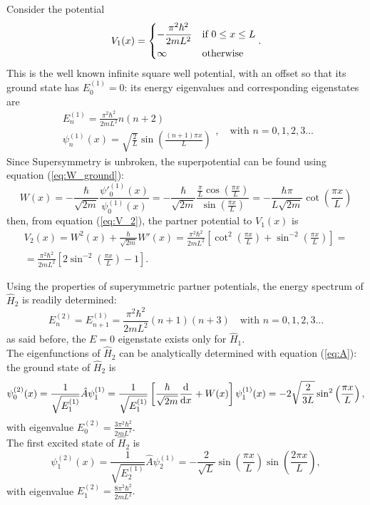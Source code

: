  Consider the potential
$$V_1(x)=\begin{dcases}
-\frac{\pi^2\hbar^2}{2mL^2}&\text{if } 0\leq x\leq L\\
\infty&\text{otherwise}
\end{dcases}.
$$
This is the well known infinite square well potential, with an offset so that its ground state
has $E^{(1)}_0=0$: its energy eigenvalues and corresponding eigenstates are
$$\begin{aligned}
E^{(1)}_n = \frac{\pi^2\hbar^2}{2mL^2}n(n+2)\\
  \psi^{(1)}_n(x)=\sqrt{\frac{2}{L}}\sin\left(\frac{(n+1)\pi x}{L}\right)  
\end{aligned},
\quad\text{with }n=0,1,2,3...$$
Since Supersymmetry is unbroken, the superpotential can be found using equation
(\ref{eq:W_ground}):
$$W(x)= -\frac{\hbar}{\sqrt{2m}}\frac{\psi'^{(1)}_0(x)}{\psi^{(1)}_0(x)} = 
-\frac{\hbar}{\sqrt{2m}}\frac{\frac{\pi}{L}\cos\left(\frac{\pi x}{L}\right)}
{\sin\left(\frac{\pi x}{L}\right)}=-\frac{\hbar\pi}{L\sqrt{2m}}\cot\left(\frac{\pi x}{L}\right)
$$
then, from equation (\ref{eq:V_2}), the partner potential to $V_1(x)$ is
\begin{gather*}
V_2(x) = W^2(x)+\frac{\hbar}{\sqrt{2m}}W'(x)=
\frac{\pi^2\hbar^2}{2mL^2}\left[\cot^2\left(\frac{\pi x}{L}\right) +
\sin^{-2}\left(\frac{\pi x}{L}\right)\right] =\\= \frac{\pi^2\hbar^2}{2mL^2}\left[
2\sin^{-2}\left(\frac{\pi x}{L}\right)-1\right].
\end{gather*}

 Using the properties of superymmetric partner potentials, the energy spectrum of
$\hat H_2$ is readily determined:
$$E^{(2)}_n=E^{(1)}_{n+1}=\frac{\pi^2\hbar^2}{2mL^2}(n+1)(n+3)\quad \text{with }n=0,1,2,3...$$
as said before, the $E=0$ eigenstate exists only for $\hat H_1$.\\

 The eigenfunctions of $\hat H_2$ can be analytically determined with equation
(\ref{eq:A}): the ground state of $\hat H_2$ is
$$\psi^{(2)}_0(x)=\frac{1}{\sqrt{E^{(1)}_1}}\hat A\psi^{(1)}_1 = \frac{1}{\sqrt{E^{(1)}_1}}\left[
\frac{\hbar}{\sqrt{2m}}\dv[]{}{x}+W(x)\right]\psi^{(1)}_1(x)=-2\sqrt{\frac{2}{3L}}\sin^2
\left(\frac{\pi x}{L}\right),$$
with eigenvalue $E^{(2)}_0 = \frac{3\pi^2\hbar^2}{2mL^2}$.\\
 The first excited state of $\hat H_2$ is
$$\psi^{(2)}_1(x)=\frac{1}{\sqrt{E^{(1)}_2}}\hat A\psi^{(1)}_2 = -\frac{2}{\sqrt{L}}
\sin\left(\frac{\pi x}{L}\right)\sin\left(\frac{2\pi x}{L}\right),$$
with eigenvalue $E^{(2)}_1=\frac{8\pi^2\hbar^2}{2mL^2}.$\\

